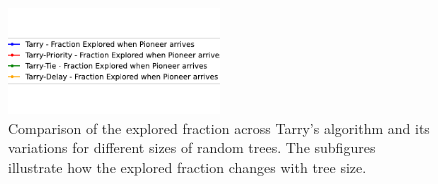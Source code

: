 \begin{figure}[H]
    \centering
    \qquad
    \qquad
    \includegraphics[width=0.5\textwidth]{Cap3/tarry_var_fraction_legend.pdf} 
    \newline 
    \qquad
    \newline 
    \qquad
    \caption{Comparison of the explored fraction across Tarry's algorithm and its variations for different sizes of random trees. The subfigures illustrate how the explored fraction changes with tree size.} 
    \label{fig_tarry_fraction_all_sizes_tree} 
\end{figure}

